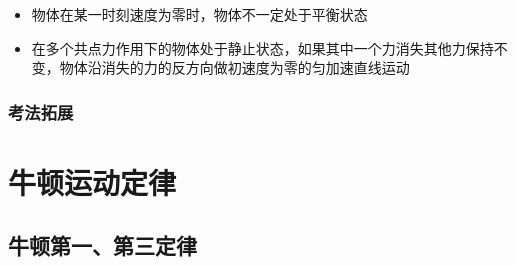 \documentclass[cn,11pt]{elegantbook}
\begin{document}
\begin{enumerate}
\begin{enumerate}
\begin{enumerate}
            \end{enumerate}
         \begin{note}
            \begin{itemize}
               \item 物体在某一时刻速度为零时，物体不一定处于平衡状态
               \item 在多个共点力作用下的物体处于静止状态，如果其中一个力消失其他力保持不变，物体沿消失的力的反方向做初速度为零的匀加速直线运动
            \end{itemize}
            
         \end{note}
         \end{enumerate}
         
      \end{enumerate}
      \subsection{考法拓展}







\chapter{牛顿运动定律}


   \section{牛顿第一、第三定律}
\end{document}
